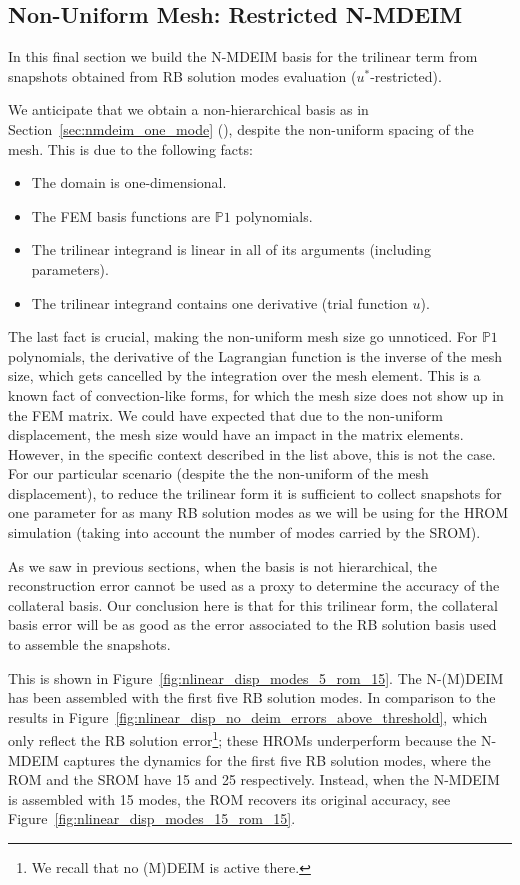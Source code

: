 \documentclass[../../thesis.tex]{subfiles}
\begin{document}
\clearpage
\subsection{Non-Uniform Mesh: Restricted N-MDEIM}
\label{sec:arbitrary_mesh_nmdeim_mode_evaluation}
In this final section we build the N-MDEIM basis for the trilinear term
from snapshots obtained from RB solution modes evaluation 
($u^{*}$-restricted).

We anticipate that we obtain a non-hierarchical basis as in
Section~\ref{sec:nmdeim_one_mode} 
(), 
despite the non-uniform spacing of the mesh.
This is due to the following facts:
\begin{itemize}
    \item The domain is one-dimensional.
    \item The FEM basis functions are $\mathbb{P}1$ polynomials.
    \item The trilinear integrand is linear in all of its arguments (including parameters).
    \item The trilinear integrand contains one derivative (trial function $u$).
\end{itemize}
The last fact is crucial, making the non-uniform mesh size go unnoticed.
For $\mathbb{P}1$ polynomials, the derivative of the Lagrangian function 
is the inverse of the mesh size, which gets cancelled 
by the integration over the mesh element.
This is a known fact of convection-like forms, 
for which the mesh size does not show up in the FEM matrix.
We could have expected that due to the non-uniform displacement,
the mesh size would have an impact in the matrix elements.
However, in the specific context described in the list above,
this is not the case.
For our particular scenario 
(despite the the non-uniform of the mesh displacement),
to reduce the trilinear form it is sufficient to collect snapshots for one parameter
for as many RB solution modes as we will be using for the HROM simulation
(taking into account the number of modes carried by the SROM). 

As we saw in previous sections, when the basis is not hierarchical, 
the reconstruction error cannot be used as a proxy to determine the accuracy of the collateral basis.
Our conclusion here is that for this trilinear form, 
the collateral basis error will be as good as the error associated 
to the RB solution basis used to assemble the snapshots.

This is shown in Figure~\ref{fig:nlinear_disp_modes_5_rom_15}.
The \mbox{N-(M)DEIM} has been assembled with the first five RB solution modes.
In comparison to the results in Figure~\ref{fig:nlinear_disp_no_deim_errors_above_threshold},
which only reflect the RB solution error\footnote
{
    We recall that no (M)DEIM is active there.
};
these HROMs underperform because the \mbox{N-MDEIM} captures the dynamics for the first five RB solution modes,
where the ROM and the SROM have 15 and 25 respectively.
Instead, when the \mbox{N-MDEIM} is assembled with 15 modes, the ROM recovers its original accuracy,
see Figure~\ref{fig:nlinear_disp_modes_15_rom_15}.
\end{document}
